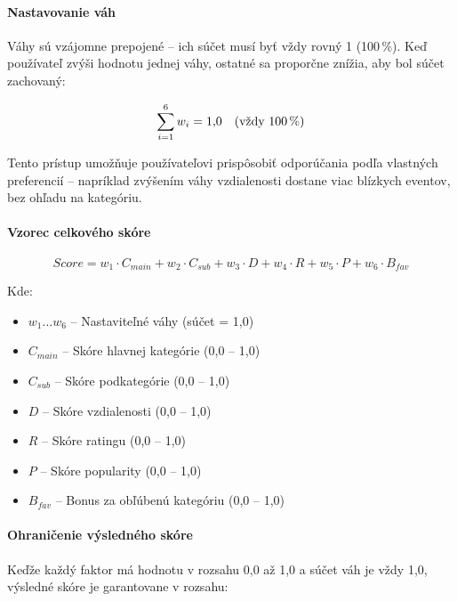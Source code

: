 \paragraph{Nastavovanie váh}

Váhy sú vzájomne prepojené -- ich súčet musí byť vždy rovný 1 (100\,\%). Keď používateľ zvýši hodnotu jednej váhy, ostatné sa proporčne znížia, aby bol súčet zachovaný:

\begin{equation}
\sum_{i=1}^{6} w_i = 1{,}0 \quad \text{(vždy 100\,\%)}
\end{equation}

Tento prístup umožňuje používateľovi prispôsobiť odporúčania podľa vlastných preferencií -- napríklad zvýšením váhy vzdialenosti dostane viac blízkych eventov, bez ohľadu na kategóriu.

\paragraph{Vzorec celkového skóre}

\begin{equation}
\boxed{
Score = w_1 \cdot C_{main} + w_2 \cdot C_{sub} + w_3 \cdot D + w_4 \cdot R + w_5 \cdot P + w_6 \cdot B_{fav}
}
\end{equation}

Kde:
\begin{itemize}
    \item $w_1 \ldots w_6$ -- Nastaviteľné váhy (súčet = 1,0)
    \item $C_{main}$ -- Skóre hlavnej kategórie (0,0 -- 1,0)
    \item $C_{sub}$ -- Skóre podkategórie (0,0 -- 1,0)
    \item $D$ -- Skóre vzdialenosti (0,0 -- 1,0)
    \item $R$ -- Skóre ratingu (0,0 -- 1,0)
    \item $P$ -- Skóre popularity (0,0 -- 1,0)
    \item $B_{fav}$ -- Bonus za obľúbenú kategóriu (0,0 -- 1,0)
\end{itemize}

\paragraph{Ohraničenie výsledného skóre}

Keďže každý faktor má hodnotu v rozsahu 0,0 až 1,0 a súčet váh je vždy 1,0, výsledné skóre je garantovane v rozsahu:

